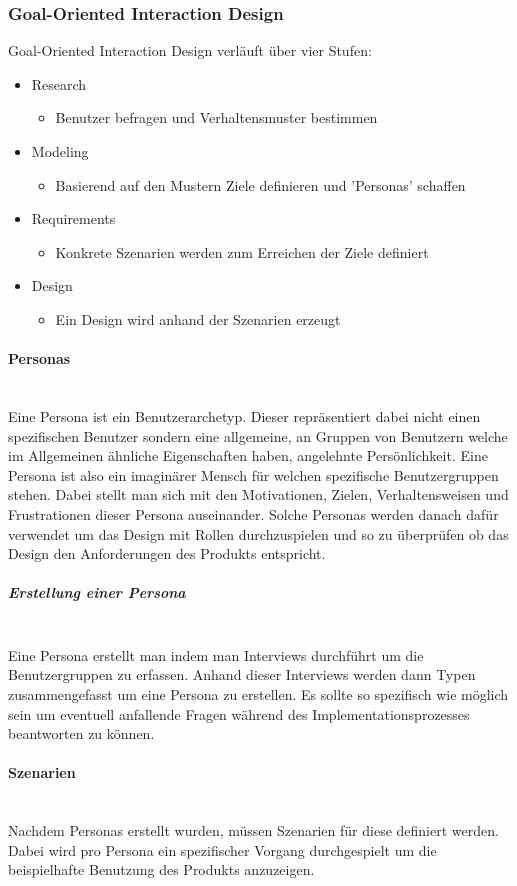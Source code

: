 \documentclass{article}
\newcommand{\paragraphlb}[1]{\paragraph{#1}\mbox{}\\}
\newcommand{\subparagraphlb}[1]{\subparagraph{#1}\mbox{}\\}
\begin{document}
	\subsubsection{Goal-Oriented Interaction Design}
	Goal-Oriented Interaction Design verläuft über vier Stufen:
	\begin{itemize}
		\item{Research}
		\begin{itemize}
			\item{Benutzer befragen und Verhaltensmuster bestimmen}
		\end{itemize}
		\item{Modeling}
		\begin{itemize}
			\item{Basierend auf den Mustern Ziele definieren und 'Personas' schaffen}
		\end{itemize}
		\item{Requirements}
		\begin{itemize}
			\item{Konkrete Szenarien werden zum Erreichen der Ziele definiert}
		\end{itemize}
		\item{Design}
		\begin{itemize}
			\item{Ein Design wird anhand der Szenarien erzeugt}
		\end{itemize}
	\end{itemize}
	\paragraphlb{Personas}
	Eine Persona ist ein Benutzerarchetyp. Dieser repräsentiert dabei nicht einen spezifischen Benutzer sondern eine allgemeine, an Gruppen von Benutzern welche im Allgemeinen ähnliche Eigenschaften haben, angelehnte Persönlichkeit. Eine Persona ist also ein imaginärer Mensch für welchen spezifische Benutzergruppen stehen. Dabei stellt man sich mit den Motivationen, Zielen, Verhaltensweisen und Frustrationen dieser Persona auseinander. Solche Personas werden danach dafür verwendet um das Design mit Rollen durchzuspielen und so zu überprüfen ob das Design den Anforderungen des Produkts entspricht.
	\subparagraphlb{Erstellung einer Persona}
	Eine Persona erstellt man indem man Interviews durchführt um die Benutzergruppen zu erfassen. Anhand dieser Interviews werden dann Typen zusammengefasst um eine Persona zu erstellen. Es sollte so spezifisch wie möglich sein um eventuell anfallende Fragen während des Implementationsprozesses beantworten zu können.
	\paragraphlb{Szenarien}
	Nachdem Personas erstellt wurden, müssen Szenarien für diese definiert werden. Dabei wird pro Persona ein spezifischer Vorgang durchgespielt um die beispielhafte Benutzung des Produkts anzuzeigen. \\
\end{document}

